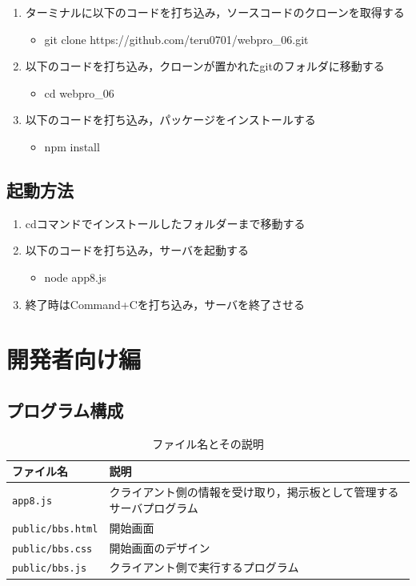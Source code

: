 \documentclass[uplatex,dvipdfmx]{jsarticle}
\begin{document}
\begin{enumerate}
	\item ターミナルに以下のコードを打ち込み，ソースコードのクローンを取得する
	\begin{itemize}
		\item git clone https://github.com/teru0701/webpro\_06.git
	\end{itemize}
	\item 以下のコードを打ち込み，クローンが置かれたgitのフォルダに移動する
	\begin{itemize}
		\item cd webpro\_06
	\end{itemize}
	\item 以下のコードを打ち込み，パッケージをインストールする
	\begin{itemize}
		\item  npm install
	\end{itemize}
\end{enumerate}

\subsection{起動方法}

\begin{enumerate}
	\item cdコマンドでインストールしたフォルダーまで移動する
	\item 以下のコードを打ち込み，サーバを起動する
	\begin{itemize}
		\item  node app8.js
	\end{itemize}
	\item 終了時はCommand+Cを打ち込み，サーバを終了させる
\end{enumerate}

\newpage

\section{開発者向け編}
\subsection{プログラム構成}

\begin{table}[h]
\centering
\begin{tabular}{|l|l|}
\hline
\textbf{ファイル名}       & \textbf{説明}                           \\ \hline
\texttt{app8.js}          & クライアント側の情報を受け取り，掲示板として管理するサーバプログラム                        \\ \hline
\texttt{public/bbs.html} & 開始画面               \\ \hline
\texttt{public/bbs.css} & 開始画面のデザイン       \\ \hline
\texttt{public/bbs.js} & クライアント側で実行するプログラム               \\ \hline
\end{tabular}
\caption{ファイル名とその説明}
\label{tab:file-description}
\end{table}
\end{document}
